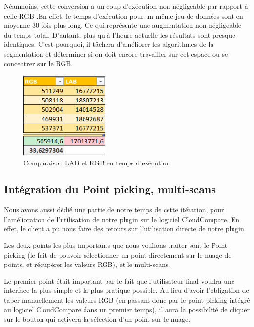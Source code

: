 \documentclass[12pt,titlepage,french]{article}
\begin{document}
Néanmoins, cette conversion a un coup d'exécution non négligeable par rapport à celle RGB .En effet, le temps d'exécution pour un même jeu de données sont en moyenne 30 fois plus long. Ce qui représente une augmentation non négligeable du temps total. D'autant, plus qu'à l'heure actuelle les résultats sont presque identiques. C'est pourquoi, il tâchera d'améliorer les algorithmes de la segmentation et déterminer si on doit encore travailler sur cet espace ou se concentrer sur le RGB.

\begin{figure}[!hbtp]
  \caption{\label{} Comparaison LAB et RGB en temps d'exécution}
  \includegraphics[width=0.4\textwidth]{./img/tableau_comparaisonRGB_LAB.png}
\end{figure}
\subsection{Intégration du Point picking, multi-scans}

Nous avons aussi dédié une partie de notre temps de cette itération, pour l'amélioration de l'utilisation de notre plugin sur le logiciel CloudCompare. En effet, le client a pu nous faire des retours sur l'utilisation directe de notre plugin.\newline

Les deux points les plus importants que nous voulions traiter sont le Point picking (le fait de pouvoir sélectionner un point directement sur le nuage de points, et récupérer les valeurs RGB), et le multi-scans. \newline

Le premier point était important par le fait que l'utilisateur final voudra une interface la plus simple et la plus pratique possible. Au lieu d'avoir l'obligation de taper manuellement les valeurs RGB (en passant donc par le point picking intégré au logiciel CloudCompare dans un premier temps), il aura la possibilité de cliquer sur le bouton qui activera la sélection d'un point sur le nuage. \newline
\end{document}

